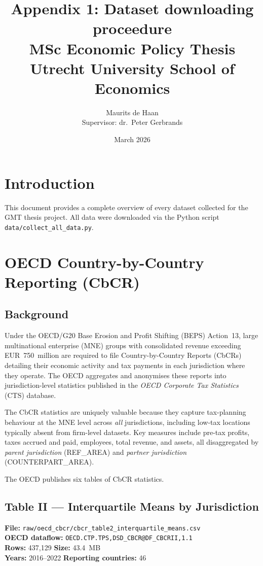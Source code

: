 \documentclass[11pt,a4paper]{article}
\title{\textbf{Appendix 1: Dataset downloading proceedure}\\[0.5em] \large MSc Economic Policy Thesis\\Utrecht University School of Economics}
\author{Maurits de Haan\\[0.3em]
\small Supervisor: dr.\ Peter Gerbrands}
\date{March 2026}
\begin{document}
\maketitle
\tableofcontents

\section{Introduction} \label{sec:intro}

This document provides a complete overview of every dataset collected for the GMT thesis project.  All data were downloaded via the Python script \texttt{data/collect\_all\_data.py}.  

\section{OECD Country-by-Country Reporting (CbCR)} \label{sec:cbcr}

\subsection{Background}
\label{subsec:cbcr_background}

Under the OECD/G20 Base Erosion and Profit Shifting (BEPS) Action~13, large
multinational enterprise (MNE) groups with consolidated revenue exceeding
EUR~750~million are required to file Country-by-Country Reports (CbCRs)
detailing their economic activity and tax payments in each jurisdiction where
they operate.  The OECD aggregates and anonymises these reports into
jurisdiction-level statistics published in the \emph{OECD Corporate Tax
Statistics} (CTS) database.

The CbCR statistics are uniquely valuable because they capture tax-planning
behaviour at the MNE level across \emph{all} jurisdictions, including
low-tax locations typically absent from firm-level datasets.  Key measures
include pre-tax profits, taxes accrued and paid, employees, total revenue,
and assets, all disaggregated by \emph{parent jurisdiction} (REF\_AREA) and
\emph{partner jurisdiction} (COUNTERPART\_AREA).

The OECD publishes six tables of CbCR statistics. 

\subsection{Table II --- Interquartile Means by Jurisdiction}
\label{subsec:cbcr_t2}

\textbf{File:} \texttt{raw/oecd\_cbcr/cbcr\_table2\_interquartile\_means.csv}\\
\textbf{OECD dataflow:} \texttt{OECD.CTP.TPS,DSD\_CBCR@DF\_CBCRII,1.1}\\
\textbf{Rows:} 437{,}129 \quad \textbf{Size:} 43.4~MB\\
\textbf{Years:} 2016--2022 \quad \textbf{Reporting countries:} 46
\end{document}
